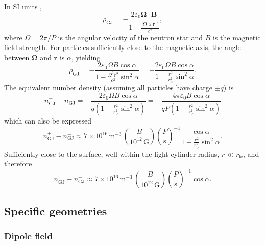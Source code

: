 \documentclass{book}
\newcommand{\rL}{r_\text{lc}} %
\begin{document}
In SI units \citep[e.g.][]{Fung2006},
\begin{equation}
    \rho_\text{GJ} = -\frac{2\varepsilon_0 {\pmb \Omega}\cdot{\pmb B}}{1 - \frac{|{\pmb \Omega}\times{\pmb r}|^2}{c^2}},
\end{equation}
where $\Omega = 2\pi/P$ is the angular velocity of the neutron star and $B$ is the magnetic field strength.
For particles sufficiently close to the magnetic axis, the angle between ${\pmb \Omega}$ and ${\pmb r}$ is $\alpha$, yielding
\begin{equation}
    \rho_\text{GJ}
        = -\frac{2\varepsilon_0 \Omega B \cos\alpha}{1 - \frac{\Omega^2 r^2}{c^2}\sin^2\alpha}
        = -\frac{2\varepsilon_0 \Omega B \cos\alpha}{1 - \frac{r^2}{\rL^2}\sin^2\alpha}.
\end{equation}
The equivalent number density (assuming all particles have charge $\pm q$) is
\begin{equation}
    n_\text{GJ}^+ - n_\text{GJ}^-
        = -\frac{2\varepsilon_0 \Omega B \cos\alpha}{q\left(1 - \frac{r^2}{\rL^2}\sin^2\alpha\right)}
        = -\frac{4\pi\varepsilon_0 B \cos\alpha}{qP\left(1 - \frac{r^2}{\rL^2}\sin^2\alpha\right)}
\end{equation}
which can also be expressed
\begin{equation}
    n_\text{GJ}^+ - n_\text{GJ}^- \approx 7 \times 10^{16}\,\text{m}^{-3} \, \left(\frac{B}{10^{12}\,\text{G}}\right) \left(\frac{P}{\text{s}}\right)^{-1} \frac{\cos\alpha}{1 - \frac{r^2}{\rL^2}\sin^2\alpha}.
\end{equation}
Sufficiently close to the surface, well within the light cylinder radius, $r \ll \rL$, and therefore
\begin{equation}
    n_\text{GJ}^+ - n_\text{GJ}^- \approx 7 \times 10^{16}\,\text{m}^{-3} \, \left(\frac{B}{10^{12}\,\text{G}}\right) \left(\frac{P}{\text{s}}\right)^{-1} \cos\alpha.
\end{equation}

\subsection{Specific geometries}

\subsubsection{Dipole field}
\end{document}

